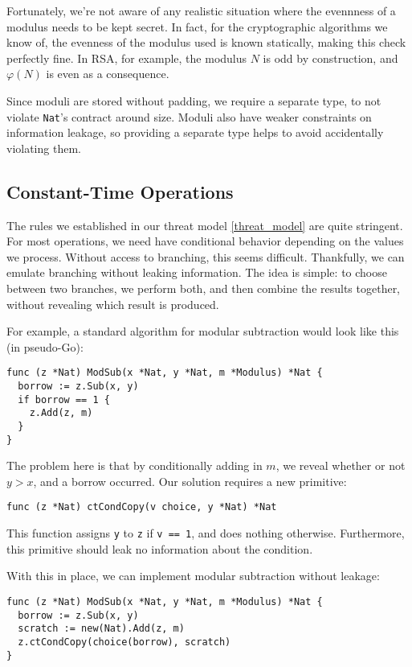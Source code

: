 \documentclass[11pt, a4paper]{article} %
\begin{document}
{Fortunately, we're not
aware of any realistic situation where the evennness of a
modulus needs to be kept secret. In fact, for the cryptographic
algorithms we know of, the evenness of the modulus used
is known statically, making this check perfectly fine.
In RSA, for example, the modulus $N$ is odd by construction, and
$\varphi(N)$ is even as a consequence.

Since moduli are stored without padding, we require a separate
type, to not violate \texttt{Nat}'s contract around size.
Moduli also have weaker constraints on information leakage,
so providing a separate type helps to avoid accidentally
violating them.

\subsection{Constant-Time Operations}

The rules we established in our threat model \ref{threat_model}
are quite stringent. For most operations, we need have conditional
behavior depending on the values we process. Without access
to branching, this seems difficult.
Thankfully, we can emulate branching
without leaking information.
The idea is simple: to choose between two branches, we perform both,
and then combine
the results together, without revealing
which result is produced.

For example, a standard algorithm for modular subtraction would look
like this (in pseudo-Go):

\begin{verbatim}
func (z *Nat) ModSub(x *Nat, y *Nat, m *Modulus) *Nat {
  borrow := z.Sub(x, y)
  if borrow == 1 {
    z.Add(z, m)
  }
}
\end{verbatim}

The problem here is that by conditionally adding in $m$, we reveal
whether or not $y > x$, and a borrow occurred. Our solution
requires a new primitive:

\begin{verbatim}
func (z *Nat) ctCondCopy(v choice, y *Nat) *Nat
\end{verbatim}

This function assigns \texttt{y} to \texttt{z} if
\texttt{v == 1}, and does nothing otherwise.
Furthermore, this primitive should leak no information about
the condition.

With this in place, we can implement modular subtraction without leakage:

\begin{verbatim}
func (z *Nat) ModSub(x *Nat, y *Nat, m *Modulus) *Nat {
  borrow := z.Sub(x, y)
  scratch := new(Nat).Add(z, m)
  z.ctCondCopy(choice(borrow), scratch)
}
\end{verbatim}

}
\end{document}
